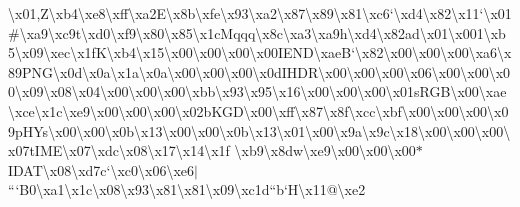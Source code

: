 \begin{DoxyCompactItemize}
\textbackslash{}x01,\+Z\textbackslash{}xb4\textbackslash{}xe8\textbackslash{}xff\textbackslash{}xa2\+E\textbackslash{}x8b\textbackslash{}xfe\textbackslash{}x93\textbackslash{}xa2\textbackslash{}x87\textbackslash{}x89\textbackslash{}x81\textbackslash{}xc6`\textbackslash{}xd4\textbackslash{}x82\textbackslash{}x11`\textbackslash{}x01\#\textbackslash{}xa9\textbackslash{}xc9t\textbackslash{}xd0\textbackslash{}xf9\textbackslash{}x80\textbackslash{}x85\textbackslash{}x1c\+Mqqq\textbackslash{}x8c\textbackslash{}xa3\textbackslash{}xa9h\textbackslash{}xd4\textbackslash{}x82ad\textbackslash{}x01\textbackslash{}x001\textbackslash{}xb5\textbackslash{}x09\textbackslash{}xec\textbackslash{}x1f\+K\textbackslash{}xb4\textbackslash{}x15\textbackslash{}x00\textbackslash{}x00\textbackslash{}x00\textbackslash{}x00\+I\+E\+N\+D\textbackslash{}xae\+B`\textbackslash{}x82\textbackslash{}x00\textbackslash{}x00\textbackslash{}x00\textbackslash{}xa6\textbackslash{}x89\+P\+N\+G\textbackslash{}x0d\textbackslash{}x0a\textbackslash{}x1a\textbackslash{}x0a\textbackslash{}x00\textbackslash{}x00\textbackslash{}x00\textbackslash{}x0d\+I\+H\+D\+R\textbackslash{}x00\textbackslash{}x00\textbackslash{}x00\textbackslash{}x06\textbackslash{}x00\textbackslash{}x00\textbackslash{}x00\textbackslash{}x09\textbackslash{}x08\textbackslash{}x04\textbackslash{}x00\textbackslash{}x00\textbackslash{}x00\textbackslash{}xbb\textbackslash{}x93\textbackslash{}x95\textbackslash{}x16\textbackslash{}x00\textbackslash{}x00\textbackslash{}x00\textbackslash{}x01s\+R\+G\+B\textbackslash{}x00\textbackslash{}xae\textbackslash{}xce\textbackslash{}x1c\textbackslash{}xe9\textbackslash{}x00\textbackslash{}x00\textbackslash{}x00\textbackslash{}x02b\+K\+G\+D\textbackslash{}x00\textbackslash{}xff\textbackslash{}x87\textbackslash{}x8f\textbackslash{}xcc\textbackslash{}xbf\textbackslash{}x00\textbackslash{}x00\textbackslash{}x00\textbackslash{}x09p\+H\+Ys\textbackslash{}x00\textbackslash{}x00\textbackslash{}x0b\textbackslash{}x13\textbackslash{}x00\textbackslash{}x00\textbackslash{}x0b\textbackslash{}x13\textbackslash{}x01\textbackslash{}x00\textbackslash{}x9a\textbackslash{}x9c\textbackslash{}x18\textbackslash{}x00\textbackslash{}x00\textbackslash{}x00\textbackslash{}x07t\+I\+M\+E\textbackslash{}x07\textbackslash{}xdc\textbackslash{}x08\textbackslash{}x17\textbackslash{}x14\textbackslash{}x1f \textbackslash{}xb9\textbackslash{}x8dw\textbackslash{}xe9\textbackslash{}x00\textbackslash{}x00\textbackslash{}x00$\ast$\+I\+D\+A\+T\textbackslash{}x08\textbackslash{}xd7c`\textbackslash{}xc0\textbackslash{}x06\textbackslash{}xe6$\vert$```\+B0\textbackslash{}xa1\textbackslash{}x1c\textbackslash{}x08\textbackslash{}x93\textbackslash{}x81\textbackslash{}x81\textbackslash{}x09\textbackslash{}xc1d``b`\+H\textbackslash{}x11@\textbackslash{}xe2 
\end{DoxyCompactItemize}
